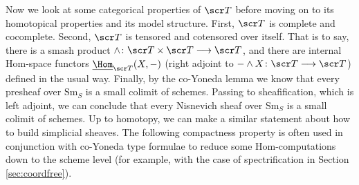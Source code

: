 \documentclass{amsart}
\newtheorem{prop}[thm]{Proposition}
\theoremstyle{definition}
\begin{document}

Now we look at some categorical properties of $\sT$ before moving on to its homotopical properties and its model structure. First, $\sT$ is complete and cocomplete. Second, $\sT$ is tensored and cotensored over itself. That is to say, there is a smash product $\wedge \colon \sT \times \sT \rtarr \sT$, and there are internal Hom-space functors $\underline{\Hom}_{\sT} (X, -)$ (right adjoint to $- \wedge X \colon \sT \rtarr \sT$) defined in the usual way. Finally, by the co-Yoneda lemma we know that every presheaf over $\mathrm{Sm}_S$ is a small colimit of schemes. Passing to sheafification, which is left adjoint, we can conclude that every Nisnevich sheaf over $\mathrm{Sm}_S$ is a small colimit of schemes. Up to homotopy, we can make a similar statement about how to build simplicial sheaves. The following compactness property \cite[Lemma 17.2]{Hu03} is often used in conjunction with co-Yoneda type formulae to reduce some Hom-computations down to the scheme level (for example, with the case of spectrification in Section \ref{sec:coordfree}).  
\end{document}

